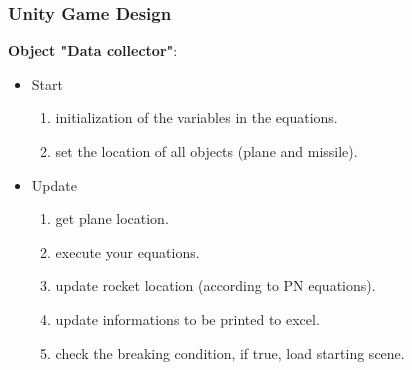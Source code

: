 \documentclass{beamer}
\begin{document}
\begin{frame}
\frametitle{Unity Game Design}
\textbf{Object "Data collector"}:
\begin{itemize}
\item Start
\begin{enumerate}
	\item initialization of the variables in the equations.
	\item set the location of all objects (plane and missile).
\end{enumerate}
\item Update 
\begin{enumerate}
	\item get plane location.
	\item execute your equations.
	\item update rocket location (according to PN equations).
	\item update informations to be printed to excel.
	\item check the breaking condition, if true, load starting scene.
\end{enumerate}
\end{itemize}
\end{frame}
\end{document}
